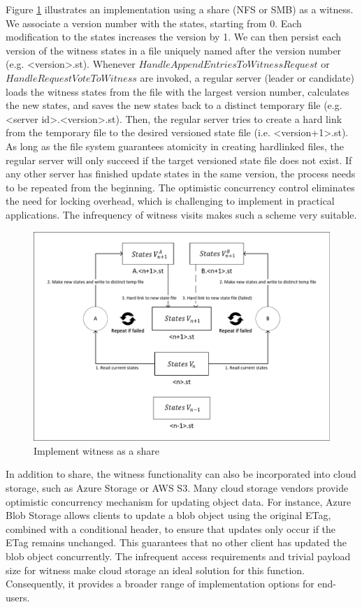 Figure \ref{fig:share-witness-implementation} illustrates an implementation using a share (NFS or SMB) as a witness. We associate a version number with the states, starting from 0. Each modification to the states increases the version by 1. We can then persist each version of the witness states in a file uniquely named after the version number (e.g. \textless{}version\textgreater{}.st). Whenever $HandleAppendEntriesToWitnessRequest$ or $HandleRequestVoteToWitness$ are invoked, a regular server (leader or candidate) loads the witness states from the file with the largest version number, calculates the new states, and saves the new states back to a distinct temporary file (e.g. \textless{}server id\textgreater{}.\textless{}version\textgreater{}.st). Then, the regular server tries to create a hard link from the temporary file to the desired versioned state file (i.e. \textless{}version+1\textgreater{}.st). As long as the file system guarantees atomicity in creating hardlinked files, the regular server will only succeed if the target versioned state file does not exist. If any other server has finished update states in the same version, the process needs to be repeated from the beginning. The optimistic concurrency control eliminates the need for locking overhead, which is challenging to implement in practical applications. The infrequency of witness visits makes such a scheme very suitable.

\begin{figure}
    \includegraphics[width=1\textwidth, angle=0]{share-witness-implementation.pdf}
    \caption{Implement witness as a share}
    \label{fig:share-witness-implementation}
\end{figure}

In addition to share, the witness functionality can also be incorporated into cloud storage, such as Azure Storage or AWS S3. Many cloud storage vendors provide optimistic concurrency mechanism for updating object data. For instance, Azure Blob Storage allows clients to update a blob object using the original ETag, combined with a conditional header, to ensure that updates only occur if the ETag remains unchanged. This guarantees that no other client has updated the blob object concurrently. The infrequent access requirements and trivial payload size for witness make cloud storage an ideal solution for this function. Consequently, it provides a broader range of implementation options for end-users.